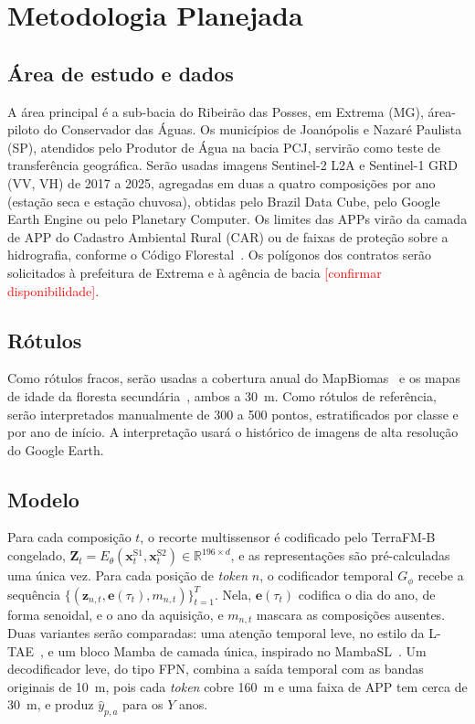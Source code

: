 \documentclass[conference]{IEEEtran}
\newcommand{\pendente}[1]{\textcolor{red}{[#1]}}
\begin{document}
\section{Metodologia Planejada}\label{sec:metodologia}

\subsection{Área de estudo e dados}

A área principal é a sub-bacia do Ribeirão das Posses, em Extrema (MG), área-piloto do Conservador das Águas. Os municípios de Joanópolis e Nazaré Paulista (SP), atendidos pelo Produtor de Água na bacia PCJ, servirão como teste de transferência geográfica. Serão usadas imagens Sentinel-2 L2A e Sentinel-1 GRD (VV, VH) de 2017 a 2025, agregadas em duas a quatro composições por ano (estação seca e estação chuvosa), obtidas pelo Brazil Data Cube, pelo Google Earth Engine ou pelo Planetary Computer. Os limites das APPs virão da camada de APP do Cadastro Ambiental Rural (CAR) ou de faixas de proteção sobre a hidrografia, conforme o Código Florestal~\citep{brasil2012}. Os polígonos dos contratos serão solicitados à prefeitura de Extrema e à agência de bacia \pendente{confirmar disponibilidade}.

\subsection{Rótulos}

Como rótulos fracos, serão usadas a cobertura anual do MapBiomas~\citep{souza2020} e os mapas de idade da floresta secundária~\citep{silva2020}, ambos a 30~m. Como rótulos de referência, serão interpretados manualmente de 300 a 500 pontos, estratificados por classe e por ano de início. A interpretação usará o histórico de imagens de alta resolução do Google Earth.

\subsection{Modelo}

Para cada composição $t$, o recorte multissensor é codificado pelo TerraFM-B congelado, $\mathbf{Z}_t = E_\theta(\mathbf{x}^{\mathrm{S1}}_t, \mathbf{x}^{\mathrm{S2}}_t) \in \mathbb{R}^{196\times d}$, e as representações são pré-calculadas uma única vez. Para cada posição de \textit{token} $n$, o codificador temporal $G_\phi$ recebe a sequência $\{(\mathbf{z}_{n,t}, \mathbf{e}(\tau_t), m_{n,t})\}_{t=1}^{T}$. Nela, $\mathbf{e}(\tau_t)$ codifica o dia do ano, de forma senoidal, e o ano da aquisição, e $m_{n,t}$ mascara as composições ausentes. Duas variantes serão comparadas: uma atenção temporal leve, no estilo da L-TAE~\citep{garnot2020ltae}, e um bloco Mamba de camada única, inspirado no MambaSL~\citep{jung2026mambasl}. Um decodificador leve, do tipo FPN, combina a saída temporal com as bandas originais de 10~m, pois cada \textit{token} cobre 160~m e uma faixa de APP tem cerca de 30~m, e produz $\hat{y}_{p,a}$ para os $Y$ anos.
\end{document}
